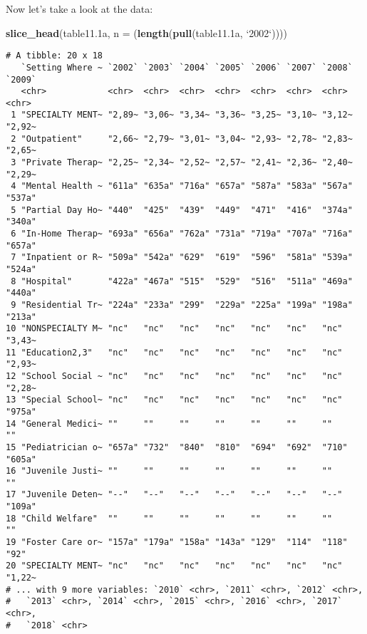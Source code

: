 \documentclass[
]{article}
\newenvironment{Shaded}{\begin{snugshade}}{\end{snugshade}}
\newcommand{\DataTypeTok}[1]{\textcolor[rgb]{0.13,0.29,0.53}{#1}}
\newcommand{\DecValTok}[1]{\textcolor[rgb]{0.00,0.00,0.81}{#1}}
\newcommand{\FloatTok}[1]{\textcolor[rgb]{0.00,0.00,0.81}{#1}}
\newcommand{\KeywordTok}[1]{\textcolor[rgb]{0.13,0.29,0.53}{\textbf{#1}}}
\newcommand{\NormalTok}[1]{#1}
\newcommand{\OperatorTok}[1]{\textcolor[rgb]{0.81,0.36,0.00}{\textbf{#1}}}
\newcommand{\StringTok}[1]{\textcolor[rgb]{0.31,0.60,0.02}{#1}}
\begin{document}
\begin{Shaded}
\end{Shaded}

Now let's take a look at the data:

\begin{Shaded}
\begin{Highlighting}[]
\KeywordTok{slice_head}\NormalTok{(table11}\FloatTok{.1}\NormalTok{a, }\DataTypeTok{n =}\NormalTok{ (}\KeywordTok{length}\NormalTok{(}\KeywordTok{pull}\NormalTok{(table11}\FloatTok{.1}\NormalTok{a, }\StringTok{`}\DataTypeTok{2002}\StringTok{`}\NormalTok{))))}
\end{Highlighting}
\end{Shaded}

\begin{verbatim}
# A tibble: 20 x 18
   `Setting Where ~ `2002` `2003` `2004` `2005` `2006` `2007` `2008` `2009`
   <chr>            <chr>  <chr>  <chr>  <chr>  <chr>  <chr>  <chr>  <chr> 
 1 "SPECIALTY MENT~ "2,89~ "3,06~ "3,34~ "3,36~ "3,25~ "3,10~ "3,12~ "2,92~
 2 "Outpatient"     "2,66~ "2,79~ "3,01~ "3,04~ "2,93~ "2,78~ "2,83~ "2,65~
 3 "Private Therap~ "2,25~ "2,34~ "2,52~ "2,57~ "2,41~ "2,36~ "2,40~ "2,29~
 4 "Mental Health ~ "611a" "635a" "716a" "657a" "587a" "583a" "567a" "537a"
 5 "Partial Day Ho~ "440"  "425"  "439"  "449"  "471"  "416"  "374a" "340a"
 6 "In-Home Therap~ "693a" "656a" "762a" "731a" "719a" "707a" "716a" "657a"
 7 "Inpatient or R~ "509a" "542a" "629"  "619"  "596"  "581a" "539a" "524a"
 8 "Hospital"       "422a" "467a" "515"  "529"  "516"  "511a" "469a" "440a"
 9 "Residential Tr~ "224a" "233a" "299"  "229a" "225a" "199a" "198a" "213a"
10 "NONSPECIALTY M~ "nc"   "nc"   "nc"   "nc"   "nc"   "nc"   "nc"   "3,43~
11 "Education2,3"   "nc"   "nc"   "nc"   "nc"   "nc"   "nc"   "nc"   "2,93~
12 "School Social ~ "nc"   "nc"   "nc"   "nc"   "nc"   "nc"   "nc"   "2,28~
13 "Special School~ "nc"   "nc"   "nc"   "nc"   "nc"   "nc"   "nc"   "975a"
14 "General Medici~ ""     ""     ""     ""     ""     ""     ""     ""    
15 "Pediatrician o~ "657a" "732"  "840"  "810"  "694"  "692"  "710"  "605a"
16 "Juvenile Justi~ ""     ""     ""     ""     ""     ""     ""     ""    
17 "Juvenile Deten~ "--"   "--"   "--"   "--"   "--"   "--"   "--"   "109a"
18 "Child Welfare"  ""     ""     ""     ""     ""     ""     ""     ""    
19 "Foster Care or~ "157a" "179a" "158a" "143a" "129"  "114"  "118"  "92"  
20 "SPECIALTY MENT~ "nc"   "nc"   "nc"   "nc"   "nc"   "nc"   "nc"   "1,22~
# ... with 9 more variables: `2010` <chr>, `2011` <chr>, `2012` <chr>,
#   `2013` <chr>, `2014` <chr>, `2015` <chr>, `2016` <chr>, `2017` <chr>,
#   `2018` <chr>
\end{verbatim}
\end{document}
